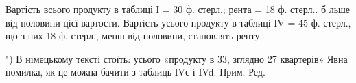 Вартість всього продукту в таблиці І = 30 ф. стерл.; рента = 18 ф.
стерл.. б льше від половини цієї вартости. Вартість усього продукту в таблиці
IV = 45 ф. стерл., що з них 18 ф. стерл., менш від половини, становлять
ренту.

") В німецькому тексті стоїть: усього «продукту в 33, зглядно 27 квартерів» Явна помилка,
як це можна бачити з таблиць ІVс і IVd. Прим. Ред.
